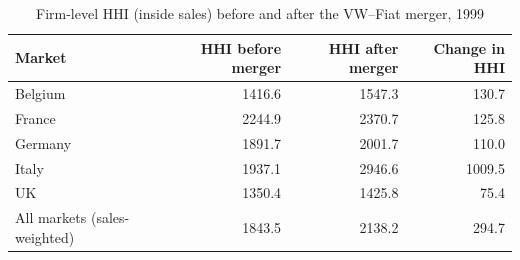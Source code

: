\begin{table}[!htbp]
\caption{Firm-level HHI (inside sales) before and after the VW--Fiat merger, 1999}
\label{tab:hhi_merger}
\begin{tabular}{lrrr}
\toprule
Market & HHI before merger & HHI after merger & Change in HHI \\
\midrule
Belgium & 1416.6 & 1547.3 & 130.7 \\
France & 2244.9 & 2370.7 & 125.8 \\
Germany & 1891.7 & 2001.7 & 110.0 \\
Italy & 1937.1 & 2946.6 & 1009.5 \\
UK & 1350.4 & 1425.8 & 75.4 \\
All markets (sales-weighted) & 1843.5 & 2138.2 & 294.7 \\
\bottomrule
\end{tabular}
\end{table}
